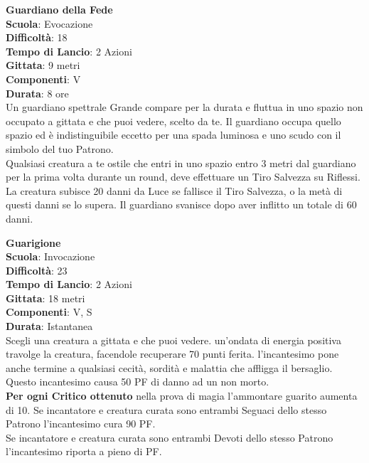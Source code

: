 \begin{multicols}{2}
\medskip\textbf{Guardiano della Fede}\\
\textbf{Scuola}: Evocazione\\
\textbf{Difficoltà}:  18\\
\textbf{Tempo di Lancio}: 2 Azioni\\
\textbf{Gittata}: 9 metri\\
\textbf{Componenti}: V\\
\textbf{Durata}: 8 ore\\
Un guardiano spettrale Grande compare per la durata e fluttua in uno spazio non occupato a gittata e che puoi vedere, scelto da te. Il guardiano occupa quello spazio ed è indistinguibile eccetto per una spada luminosa e uno scudo con il simbolo del tuo Patrono.\\
Qualsiasi creatura a te ostile che entri in uno spazio entro 3 metri dal guardiano per la prima volta durante un round, deve effettuare un Tiro Salvezza su Riflessi. La creatura subisce 20 danni da Luce se fallisce il Tiro Salvezza, o la metà di questi danni se lo supera. Il guardiano svanisce dopo aver inflitto un totale di 60 danni.

\medskip\textbf{Guarigione}\\
\textbf{Scuola}: Invocazione\\
\textbf{Difficoltà}:  23\\
\textbf{Tempo di Lancio}: 2 Azioni\\
\textbf{Gittata}: 18 metri\\
\textbf{Componenti}: V, S\\
\textbf{Durata}: Istantanea\\
Scegli una creatura a gittata e che puoi vedere. un'ondata di energia positiva travolge la creatura, facendole recuperare 70 punti ferita. l'incantesimo pone anche termine a qualsiasi cecità, sordità e malattia che affligga il bersaglio. Questo incantesimo causa 50 PF di danno ad un non morto.\\
\textbf{Per ogni Critico ottenuto} nella prova di magia l’ammontare guarito aumenta di 10.
Se incantatore e creatura curata sono entrambi Seguaci dello stesso Patrono l'incantesimo cura 90 PF.\\
Se incantatore e creatura curata sono entrambi Devoti dello stesso Patrono l'incantesimo riporta a pieno di PF.\\


\end{multicols}
